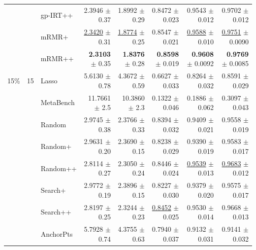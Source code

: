 \begin{longtable}{llp{}rrrrr}
 &  & gp-IRT++ & 2.3946 {\scriptsize $\pm$ 0.37} & 1.8992 {\scriptsize $\pm$ 0.29} & 0.8472 {\scriptsize $\pm$ 0.023} & 0.9543 {\scriptsize $\pm$ 0.012} & 0.9702 {\scriptsize $\pm$ 0.012} \\
 &  & mRMR+ & \underline{2.3420} {\scriptsize $\pm$ 0.31} & \underline{1.8774} {\scriptsize $\pm$ 0.25} & 0.8547 {\scriptsize $\pm$ 0.021} & \underline{0.9588} {\scriptsize $\pm$ 0.010} & \underline{0.9751} {\scriptsize $\pm$ 0.0090} \\
 &  & mRMR++ & \textbf{2.3103} {\scriptsize $\pm$ 0.35} & \textbf{1.8376} {\scriptsize $\pm$ 0.28} & \textbf{0.8598} {\scriptsize $\pm$ 0.019} & \textbf{0.9608} {\scriptsize $\pm$ 0.0092} & \textbf{0.9769} {\scriptsize $\pm$ 0.0085} \\
\midrule
15\% & 15 & Lasso & 5.6130 {\scriptsize $\pm$ 0.78} & 4.3672 {\scriptsize $\pm$ 0.59} & 0.6627 {\scriptsize $\pm$ 0.033} & 0.8264 {\scriptsize $\pm$ 0.032} & 0.8591 {\scriptsize $\pm$ 0.029} \\
 &  & MetaBench & 11.7661 {\scriptsize $\pm$ 2.5} & 10.3860 {\scriptsize $\pm$ 2.3} & 0.1322 {\scriptsize $\pm$ 0.046} & 0.1886 {\scriptsize $\pm$ 0.062} & 0.3097 {\scriptsize $\pm$ 0.043} \\
 &  & Random & 2.9745 {\scriptsize $\pm$ 0.38} & 2.3766 {\scriptsize $\pm$ 0.33} & 0.8394 {\scriptsize $\pm$ 0.032} & 0.9409 {\scriptsize $\pm$ 0.021} & 0.9558 {\scriptsize $\pm$ 0.019} \\
 &  & Random+ & 2.9631 {\scriptsize $\pm$ 0.20} & 2.3690 {\scriptsize $\pm$ 0.15} & 0.8238 {\scriptsize $\pm$ 0.029} & 0.9390 {\scriptsize $\pm$ 0.019} & 0.9583 {\scriptsize $\pm$ 0.017} \\
 &  & Random++ & 2.8114 {\scriptsize $\pm$ 0.27} & 2.3050 {\scriptsize $\pm$ 0.24} & 0.8446 {\scriptsize $\pm$ 0.024} & \underline{0.9539} {\scriptsize $\pm$ 0.013} & \underline{0.9683} {\scriptsize $\pm$ 0.012} \\
 &  & Search+ & 2.9772 {\scriptsize $\pm$ 0.19} & 2.3896 {\scriptsize $\pm$ 0.15} & 0.8227 {\scriptsize $\pm$ 0.030} & 0.9379 {\scriptsize $\pm$ 0.020} & 0.9575 {\scriptsize $\pm$ 0.017} \\
 &  & Search++ & 2.8197 {\scriptsize $\pm$ 0.25} & 2.3244 {\scriptsize $\pm$ 0.23} & \underline{0.8452} {\scriptsize $\pm$ 0.025} & 0.9530 {\scriptsize $\pm$ 0.014} & 0.9668 {\scriptsize $\pm$ 0.013} \\
 &  & AnchorPts & 5.7928 {\scriptsize $\pm$ 0.74} & 4.3755 {\scriptsize $\pm$ 0.63} & 0.7940 {\scriptsize $\pm$ 0.037} & 0.9132 {\scriptsize $\pm$ 0.031} & 0.9141 {\scriptsize $\pm$ 0.032} \\

\end{longtable}
